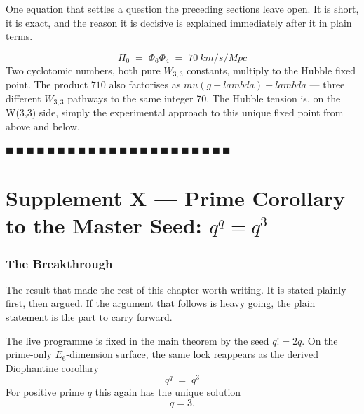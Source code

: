 \documentclass[12pt,a4paper]{article}
\def\text#1{#1}%
\def\lambda{lambda}%
\def\mu{mu}%
\def\Phi#1{Phi#1}%
\def\cdot{ }%
\theoremstyle{definition}
\begin{document}
\begin{plainbox}
One equation that settles a question the preceding sections leave open. It is short,
it is exact, and the reason it is decisive is explained immediately after it in plain
terms.
\end{plainbox}


\[
\boxed{\;H_0 \;=\; \Phi_6 \cdot \Phi_4 \;=\; 70\ \text{km/s/Mpc}\;}
\]
Two cyclotomic numbers, both pure $W_{3,3}$ constants, multiply to
the Hubble fixed point. The product $7\cdot 10$ also factorises as
$\mu(g+\lambda)+\lambda$ — three different $W_{3,3}$ pathways to the
same integer 70. The Hubble tension is, on the W(3,3) side, simply
the experimental approach to this unique fixed point from above and
below.

\hfill $\blacksquare\ \blacksquare\ \blacksquare\ \blacksquare\ \blacksquare\ \blacksquare\ \blacksquare\ \blacksquare\ \blacksquare\ \blacksquare\ \blacksquare\ \blacksquare\ \blacksquare\ \blacksquare\ \blacksquare\ \blacksquare\ \blacksquare\ \blacksquare\ \blacksquare\ \blacksquare\ \blacksquare\ \blacksquare$

\clearpage
\part*{Supplement X --- Prime Corollary to the Master Seed: $q^q = q^3$}

\section*{The Breakthrough}

\begin{plainbox}
The result that made the rest of this chapter worth writing. It is stated plainly
first, then argued. If the argument that follows is heavy going, the plain statement is the
part to carry forward.
\end{plainbox}


The live programme is fixed in the main theorem by the seed $q!=2q$.
On the prime-only $E_6$-dimension surface, the same lock reappears as the
derived Diophantine corollary
\[
\boxed{\;q^q \;=\; q^3\;}
\]
For positive prime $q$ this again has the unique solution
\[
\boxed{\;q = 3.\;}
\]
\end{document}
